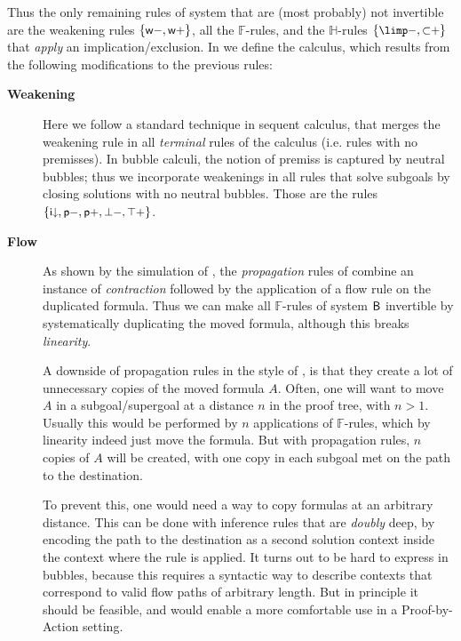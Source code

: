 Thus the only remaining rules of system  that are (most probably) not
invertible are the weakening rules $\{\text{\small$\mathsf{w{-}}$},\text{\small$\mathsf{w{+}}$}\}$, all the
$\mathbb{F}$-rules, and the $\mathbb{H}$-rules $\{\rsf{{\limp}{-}},
\rsf{{\lsub}{+}}\}$ that \emph{apply} an implication/exclusion.
In  we define the  calculus, which results
from the following modifications to the previous rules:
\begin{description}
  \item[\textbf{Weakening}]
    Here we follow a standard technique in sequent calculus, that merges the
    weakening rule in all \emph{terminal} rules of the calculus (i.e. rules with
    no premisses). In bubble calculi, the notion of premiss is captured by neutral
    bubbles; thus we incorporate weakenings in all rules that solve subgoals by
    closing solutions with no neutral bubbles. Those are the rules
    $\{\text{\small$\mathsf{i{\downarrow}}$},\text{\small$\mathsf{p{-}}$},\text{\small$\mathsf{p{+}}$},\text{\small$\mathsf{\bot{-},\text{\small$\mathsf{\top{+}}$}}$}\}$.

  \item[\textbf{Flow}]
    As shown by the simulation of , the
    \emph{propagation} rules of  combine an instance of
    \emph{contraction} followed by the application of a flow rule on the
    duplicated formula. Thus we can make all $\mathbb{F}$-rules of system $\sysB$
    invertible by systematically duplicating the moved formula, although this
    breaks \emph{linearity}.

    A downside of propagation rules in the style of , is that they
    create a lot of unnecessary copies of the moved formula $A$. Often, one will
    want to move $A$ in a subgoal/supergoal at a distance $n$ in the proof tree,
    with $n > 1$. Usually this would be performed by $n$ applications of
    $\mathbb{F}$-rules, which by linearity indeed just move the formula. But with
    propagation rules, $n$ copies of $A$ will be created, with one copy in each
    subgoal met on the path to the destination.

    To prevent this, one would need a way to copy formulas at an arbitrary
    distance. This can be done with inference rules that are \emph{doubly} deep,
    by encoding the path to the destination as a second solution context inside
    the context where the rule is applied. It turns out to be hard
    to express in bubbles, because this requires a syntactic way to describe
    contexts that correspond to valid flow paths of arbitrary length. But in principle it should be feasible,
    and would enable a more comfortable use in a Proof-by-Action setting.


\end{description}
